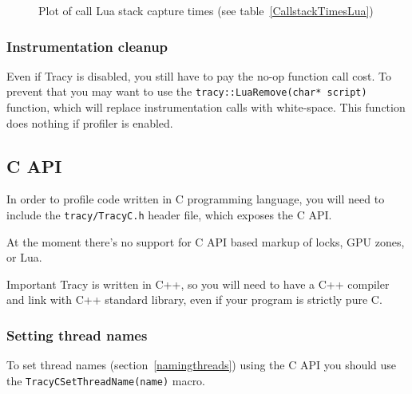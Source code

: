 \documentclass[hidelinks,titlepage,a4paper]{article}
\begin{document}
\begin{figure}[h]
\centering{}
\caption{Plot of call Lua stack capture times (see table~\ref{CallstackTimesLua})}
\label{CallstackPlotLua}
\end{figure}

\subsubsection{Instrumentation cleanup}

Even if Tracy is disabled, you still have to pay the no-op function call cost. To prevent that you may want to use the \texttt{tracy::LuaRemove(char* script)} function, which will replace instrumentation calls with white-space. This function does nothing if profiler is enabled.

\subsection{C API}
\label{capi}

In order to profile code written in C programming language, you will need to include the \texttt{tracy/TracyC.h} header file, which exposes the C API.

At the moment there's no support for C API based markup of locks, GPU zones, or Lua.

\begin{bclogo}[
noborder=true,
couleur=black!5,
logo=\bcbombe
]{Important}
Tracy is written in C++, so you will need to have a C++ compiler and link with C++ standard library, even if your program is strictly pure C.
\end{bclogo}

\subsubsection{Setting thread names}

To set thread names (section~\ref{namingthreads}) using the C API you should use the \texttt{TracyCSetThreadName(name)} macro.
\end{document}

